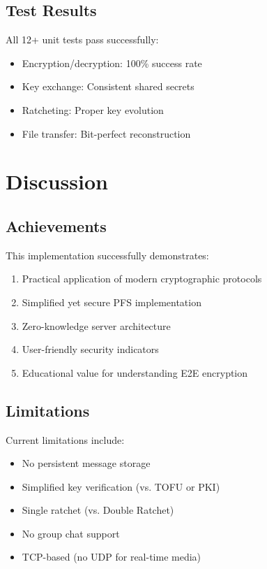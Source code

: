 \documentclass[conference]{IEEEtran}
\begin{document}
\subsection{Test Results}

All 12+ unit tests pass successfully:

\begin{itemize}
    \item Encryption/decryption: 100\% success rate
    \item Key exchange: Consistent shared secrets
    \item Ratcheting: Proper key evolution
    \item File transfer: Bit-perfect reconstruction
\end{itemize}

\section{Discussion}

\subsection{Achievements}

This implementation successfully demonstrates:

\begin{enumerate}
    \item Practical application of modern cryptographic protocols
    \item Simplified yet secure PFS implementation
    \item Zero-knowledge server architecture
    \item User-friendly security indicators
    \item Educational value for understanding E2E encryption
\end{enumerate}

\subsection{Limitations}

Current limitations include:

\begin{itemize}
    \item No persistent message storage
    \item Simplified key verification (vs. TOFU or PKI)
    \item Single ratchet (vs. Double Ratchet)
    \item No group chat support
    \item TCP-based (no UDP for real-time media)
\end{itemize}
\end{document}
